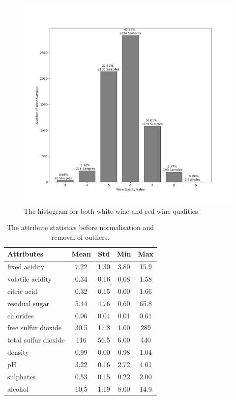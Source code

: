 \documentclass[10pt,twocolumn,letterpaper]{article}
\begin{document}
\begin{figure}[h]
	\begin{center}
		\includegraphics[width=0.9\linewidth]{img/samples.png}
	\end{center}
	\caption{The histogram for both white wine and red wine qualities.}
	\label{fig:hist}
\end{figure}


\begin{table}[h]
	\begin{center}
		\begin{tabular}{|l|c|c|c|c|}
			\hline
			Attributes & Mean & Std & Min & Max \\
			\hline
			fixed acidity & 7.22 & 1.30 & 3.80 & 15.9 \\
			volatile acidity & 0.34 & 0.16 & 0.08 & 1.58 \\
			citric acid & 0.32 & 0.15 & 0.00 & 1.66 \\
			residual sugar & 5.44 & 4.76 & 0.60 & 65.8 \\
			chlorides & 0.06 & 0.04 & 0.01 & 0.61 \\
			free sulfur dioxide & 30.5 & 17.8 & 1.00 & 289 \\
			total sulfur dioxide & 116 & 56.5 & 6.00 & 440 \\
			density & 0.99 & 0.00 & 0.98 & 1.04 \\
			pH & 3.22 & 0.16 & 2.72 & 4.01 \\
			sulphates & 0.53 & 0.15 & 0.22 & 2.00 \\
			alcohol & 10.5 & 1.19 & 8.00 & 14.9 \\ 
			\hline
		\end{tabular}
	\end{center}
	\caption{The attribute statistics before normalisation and removal of outliers.}
	\label{tab:attributes}
\end{table}
\end{document}
